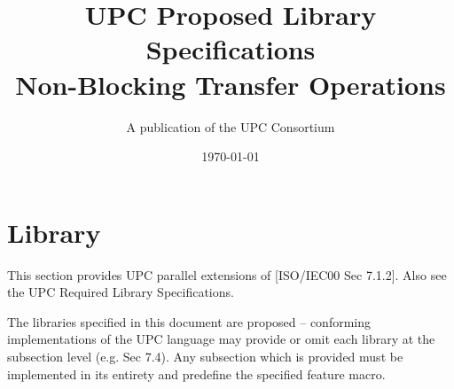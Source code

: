\newcommand{\myspecversion}{Version 1.3}
\newcommand{\mydraftversion}{Draft 2.2}
\newcommand{\myversion}{\specversion}
\newcommand{\mytitle}{UPC Proposed Library Specifications\\
                      Non-Blocking Transfer Operations}


\makeindex

\title{\mytitle\\
\myversion}

\author{A publication of the UPC Consortium}

\date{\today}



\maketitle

\setcounter{page}{2}
\dotoc

\setcounter{section}{6} %
\section{Library}

\npf This section provides UPC parallel extensions of [ISO/IEC00 Sec 7.1.2].
Also see the UPC Required Library Specifications.

\np The libraries specified in this document are proposed --
conforming implementations of the UPC language may provide or 
omit each library at the subsection level (e.g. Sec 7.4). 
Any subsection which is provided must be implemented in its
entirety and predefine the specified feature macro.

\setcounter{subsection}{3} %


\doindex

